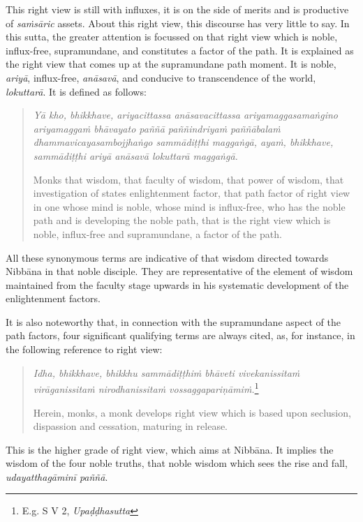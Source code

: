 This right view is still with influxes, it is on the side of merits and is productive of \emph{saṁsāric} assets. About this right view, this discourse has very little to say. In this sutta, the greater attention is focussed on that right view which is noble, influx-free, supramundane, and constitutes a factor of the path. It is explained as the right view that comes up at the supramundane path moment. It is noble, \emph{ariyā}, influx-free, \emph{anāsavā}, and conducive to transcendence of the world, \emph{lokuttarā}. It is defined as follows:

\begin{quote}
\emph{Yā kho, bhikkhave, ariyacittassa anāsavacittassa ariyamaggasamaṅgino ariyamaggaṁ bhāvayato paññā paññindriyaṁ paññābalaṁ dhammavicayasambojjhaṅgo sammādiṭṭhi maggaṅgā, ayaṁ, bhikkhave, sammādiṭṭhi ariyā anāsavā lokuttarā maggaṅgā.}

Monks that wisdom, that faculty of wisdom, that power of wisdom, that investigation of states enlightenment factor, that path factor of right view in one whose mind is noble, whose mind is influx-free, who has the noble path and is developing the noble path, that is the right view which is noble, influx-free and supramundane, a factor of the path.
\end{quote}

All these synonymous terms are indicative of that wisdom directed towards Nibbāna in that noble disciple. They are representative of the element of wisdom maintained from the faculty stage upwards in his systematic development of the enlightenment factors.

It is also noteworthy that, in connection with the supramundane aspect of the path factors, four significant qualifying terms are always cited, as, for instance, in the following reference to right view:

\begin{quote}
\emph{Idha, bhikkhave, bhikkhu sammādiṭṭhiṁ bhāveti vivekanissitaṁ virāganissitaṁ nirodhanissitaṁ vossaggapariṇāmiṁ.}\footnote{E.g. S V 2, \emph{Upaḍḍhasutta}}

Herein, monks, a monk develops right view which is based upon seclusion, dispassion and cessation, maturing in release.
\end{quote}

This is the higher grade of right view, which aims at Nibbāna. It implies the wisdom of the four noble truths, that noble wisdom which sees the rise and fall, \emph{udayatthagāminī paññā}.


